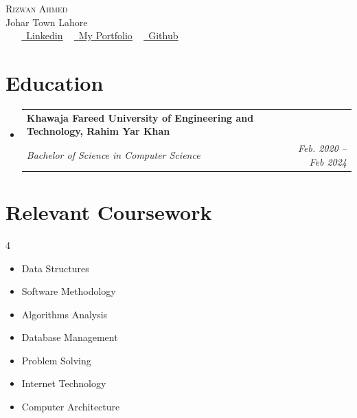\documentclass[letterpaper,11pt]{article}
\makeatletter
\newcommand{\resumeSubheading}[4]{
  \vspace{-2pt}\item
    \begin{tabular*}{1.0\textwidth}[t]{l@{\extracolsep{\fill}}r}
      \textbf{#1} & \textbf{\small #2} \\
      \textit{\small#3} & \textit{\small #4} \\
    \end{tabular*}\vspace{-7pt}
}
\newcommand{\resumeSubHeadingListStart}{\begin{itemize}[leftmargin=0.0in, label={}]}
\newcommand{\resumeSubHeadingListEnd}{\end{itemize}}
\makeatother
\begin{document}
\begin{center}
    {\Huge \scshape Rizwan Ahmed} \\ \vspace{1pt}
    Johar Town Lahore \\ \vspace{1pt}
    \small  
    \href{tel:+923008645286}{} ~ \href{mailto:rizzikhan66@gmail.com}{} ~ \href{http://www.linkedin.com/in/rizwanahmed66}{\raisebox{-0.2\height}\ \underline{Linkedin}} ~ \href{https://portfolio-ef9a6.web.app/}{\raisebox{-0.2\height}\ \underline{My Portfolio}} ~ \href{https://github.com/rizzikhan}{\raisebox{-0.2\height}\ \underline{Github}}
    \vspace{-8pt}
\end{center}


\section{Education}
  \resumeSubHeadingListStart
    \resumeSubheading
      {Khawaja Fareed University of Engineering and Technology, Rahim Yar Khan}{}
      {Bachelor of Science in Computer Science}{Feb. 2020 -- Feb 2024}
  \resumeSubHeadingListEnd

\section{Relevant Coursework}
        \begin{multicols}{4}
            \begin{itemize}[itemsep=-5pt, parsep=3pt]
                \item\small Data Structures
                \item Software Methodology
                \item Algorithms Analysis
                \item Database Management
                \item Problem Solving
                \item Internet Technology
                \item Computer Architecture
            \end{itemize}
        \end{multicols}
        \vspace*{2.0\multicolsep}
\end{document}
